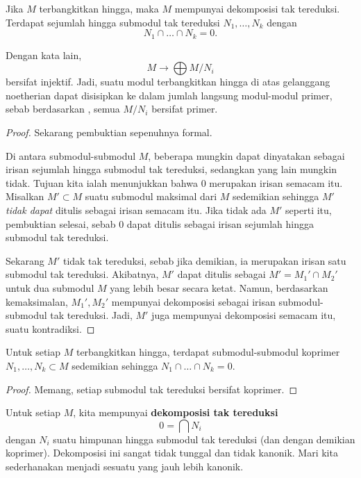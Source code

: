 \begin{proposition} 
Jika $M$ terbangkitkan hingga, maka $M$ mempunyai dekomposisi tak tereduksi. Terdapat sejumlah hingga submodul tak tereduksi
$N_1, \dots, N_k$ dengan
\[  N_1 \cap \dots \cap N_k = 0. \]
\end{proposition} 
Dengan kata lain,
\[  M \to \bigoplus M/N_i  \]
bersifat injektif.
Jadi, suatu modul terbangkitkan hingga di atas gelanggang noetherian dapat disisipkan ke dalam jumlah langsung
modul-modul primer, sebab berdasarkan , semua $M/N_i$
bersifat primer. 

\begin{proof} Sekarang pembuktian sepenuhnya formal. 

Di antara submodul-submodul $M$, beberapa mungkin dapat dinyatakan sebagai irisan
sejumlah hingga submodul tak tereduksi, sedangkan yang lain mungkin tidak. Tujuan kita ialah menunjukkan bahwa
$0$ merupakan irisan semacam itu.
Misalkan $M' \subset M$ suatu submodul maksimal dari $M$ sedemikian sehingga $M'$ \emph{tidak dapat}
ditulis sebagai irisan semacam itu. Jika tidak ada
$M'$ seperti itu, pembuktian selesai, sebab $0$ dapat ditulis sebagai
irisan sejumlah hingga submodul tak tereduksi.

Sekarang $M'$ tidak tak tereduksi, sebab jika demikian, ia merupakan irisan satu submodul
tak tereduksi.
Akibatnya, $M'$ dapat ditulis sebagai $M'=M_1' \cap M_2'$ untuk dua submodul
$M$ yang lebih besar secara ketat. Namun, berdasarkan kemaksimalan, $M_1', M_2'$ mempunyai dekomposisi sebagai
irisan submodul-submodul tak tereduksi. Jadi, $M'$ juga mempunyai dekomposisi semacam itu, suatu kontradiksi. 
\end{proof} 

\begin{corollary} 
Untuk setiap $M$ terbangkitkan hingga, terdapat submodul-submodul koprimer $N_1, \dots,
N_k \subset M$ sedemikian sehingga $N_1 \cap \dots \cap N_k  = 0$.
\end{corollary} 
\begin{proof} 
Memang, setiap submodul tak tereduksi bersifat koprimer.
\end{proof} 


Untuk setiap $M$, kita mempunyai \textbf{dekomposisi tak tereduksi}
\[ 0 = \bigcap N_i  \]
dengan $N_i$ suatu himpunan hingga submodul tak tereduksi (dan dengan demikian koprimer). 
Dekomposisi ini sangat tidak tunggal dan tidak kanonik. Mari kita
sederhanakan menjadi sesuatu yang jauh lebih kanonik.

